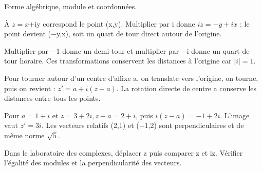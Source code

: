 \documentclass[11pt]{article}
\begin{document}
Forme algébrique, module et coordonnées.\par
{}
À \(z=x\)+iy correspond le point (x,y). Multiplier par i donne \(iz=-y+ix\) : le point devient (−y,x), soit un quart de tour direct autour de l’origine.\par
Multiplier par −1 donne un demi-tour et multiplier par −i donne un quart de tour horaire. Ces transformations conservent les distances à l’origine car |\(i|=1\).\par
Pour tourner autour d’un centre d’affixe a, on translate vers l’origine, on tourne, puis on revient : \(z'=a+i(z-a)\). La rotation directe de centre a conserve les distances entre tous les points.\par
{}
Pour \(a=1+i\) et \(z=3+2i, z-a=2+i\), puis \(i(z-a)=-1+2i\). L’image vaut \(z'=3i\). Les vecteurs relatifs (2,1) et (−1,2) sont perpendiculaires et de même norme \(\sqrt{5}\).\par
\begin{center}\end{center}
Dans le laboratoire des complexes, déplacer z puis comparer z et iz. Vérifier l’égalité des modules et la perpendicularité des vecteurs.\par
\end{document}
